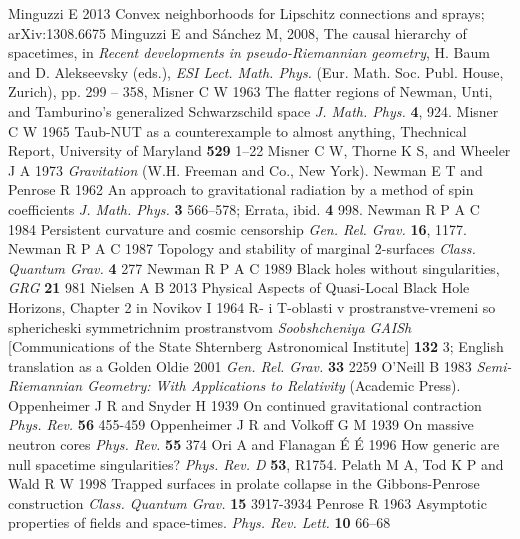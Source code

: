 \documentclass[12pt]{iopart}
\begin{document}
\begin{thebibliography}{999}
 Minguzzi E 2013 Convex neighborhoods for Lipschitz connections and sprays;  arXiv:1308.6675
 Minguzzi E and S\'anchez M, 2008, The causal hierarchy of spacetimes,  in {\it Recent developments in pseudo-Riemannian geometry}, H. Baum and D. Alekseevsky (eds.), {\it ESI Lect. Math. Phys.} (Eur. Math. Soc. Publ. House, Zurich), pp. 299 -- 358,
 Misner C W 1963 The flatter regions of Newman, Unti, and Tamburino's generalized Schwarzschild space {\it J. Math. Phys.} {\bf 4}, 924.
 Misner C W 1965 Taub-NUT as a counterexample to almost anything, Thechnical Report, University of Maryland {\bf 529} 1--22
 Misner C W, Thorne K S, and Wheeler J A 1973 {\it
Gravitation} (W.H. Freeman and Co., New York).
Newman E T and Penrose R 1962 An approach to gravitational radiation by a method of spin coefficients {\it J. Math. Phys.} {\bf 3} 566--578; Errata, {ibid.} {\bf 4} 998.
 Newman R P A C 1984 Persistent curvature and cosmic censorship {\it Gen. Rel. Grav.} {\bf 16},
1177.%
 Newman R P A C 1987 Topology and stability of marginal 2-surfaces {\it Class. Quantum Grav.} {\bf 4} 277
 Newman R P A C 1989 Black holes without singularities,  {\it GRG} {\bf 21} 981
 Nielsen A B 2013 Physical Aspects of Quasi-Local Black Hole Horizons, Chapter 2 in \cite{HayBook}
 Novikov I 1964 R- i T-oblasti v prostranstve-vremeni so sphericheski symmetrichnim prostranstvom {\it Soobshcheniya GAISh} [Communications of the State Shternberg Astronomical
Institute] {\bf 132} 3; English translation as a Golden Oldie 2001 {\it Gen. Rel. Grav.} {\bf 33} 2259%
 O'Neill B 1983 {\it Semi-Riemannian Geometry: 
With Applications to Relativity} (Academic Press).
 Oppenheimer J R and Snyder H 1939 On continued gravitational 
contraction {\it Phys. Rev.} {\bf 56} 455-459
 Oppenheimer J R and Volkoff G M 1939 On massive neutron cores {\it Phys. Rev.} {\bf 55} 374
 Ori A and Flanagan \'{E} \'{E} 1996 How generic are null spacetime singularities? {\it Phys. Rev. D} {\bf 53},
R1754.%
 Pelath M A, Tod K P and Wald R W 1998 Trapped surfaces in prolate collapse in the Gibbons-Penrose construction {\it Class. Quantum Grav.} {\bf 15} 3917-3934
 Penrose R 1963 Asymptotic properties of fields and space-times.  {\it Phys. Rev. Lett.} {\bf 10}  66--68

\end{thebibliography}
\end{document}

